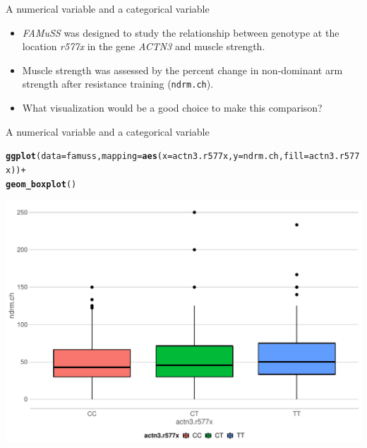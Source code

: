 \documentclass[10pt,handout]{beamer}\usepackage[]{graphicx}\usepackage[]{color}
\makeatletter
\def\maxwidth{ %
  \ifdim\Gin@nat@width>\linewidth
    \linewidth
  \else
    \Gin@nat@width
  \fi
}
\newcommand{\hlopt}[1]{\textcolor[rgb]{0,0,0}{#1}}%
\newcommand{\hlstd}[1]{\textcolor[rgb]{0.345,0.345,0.345}{#1}}%
\newcommand{\hlkwc}[1]{\textcolor[rgb]{0.333,0.667,0.333}{#1}}%
\newcommand{\hlkwd}[1]{\textcolor[rgb]{0.737,0.353,0.396}{\textbf{#1}}}%
\newenvironment{kframe}{%
 \def\at@end@of@kframe{}%
 \ifinner\ifhmode%
  \def\at@end@of@kframe{\end{minipage}}%
  \begin{minipage}{\columnwidth}%
 \fi\fi%
 \def\FrameCommand##1{\hskip\@totalleftmargin \hskip-\fboxsep
 \colorbox{shadecolor}{##1}\hskip-\fboxsep
     \hskip-\linewidth \hskip-\@totalleftmargin \hskip\columnwidth}%
 \MakeFramed {\advance\hsize-\width
   \@totalleftmargin\z@ \linewidth\hsize
   \@setminipage}}%
 {\par\unskip\endMakeFramed%
 \at@end@of@kframe}
\newenvironment{knitrout}{}{} %
\makeatother
\begin{document}
\begin{frame}{A numerical variable and a categorical variable}
	\protect\hypertarget{a-numerical-variable-and-a-categorical-variable}{}
	
	\begin{itemize}
		\item \emph{FAMuSS} was designed to study the relationship between genotype at
	the location \emph{r577x} in the gene \emph{ACTN3} and muscle strength.
	
	\item Muscle strength was assessed by the percent change in non-dominant arm
	strength after resistance training (\texttt{ndrm.ch}).
	
	\item What visualization would be a good choice to make this comparison?
	\end{itemize}
	
\end{frame}


\begin{frame}[fragile]{A numerical variable and a categorical variable}
	\protect\hypertarget{a-numerical-variable-and-a-categorical-variable-1}{}
	
	\scriptsize
	
	\scriptsize
	

	
\begin{knitrout}\scriptsize
{}\color{fgcolor}\begin{kframe}
\begin{alltt}
\hlkwd{ggplot}\hlstd{(}\hlkwc{data} \hlstd{= famuss,} \hlkwc{mapping} \hlstd{=} \hlkwd{aes}\hlstd{(}\hlkwc{x} \hlstd{= actn3.r577x,} \hlkwc{y} \hlstd{= ndrm.ch,} \hlkwc{fill} \hlstd{= actn3.r577x))} \hlopt{+}
  \hlkwd{geom_boxplot}\hlstd{()}
\end{alltt}
\end{kframe}

{\centering \includegraphics[width=\maxwidth]{figure/box-1-1} 

}



\end{knitrout}
	
	
	\normalsize
	
\end{frame}
\end{document}
